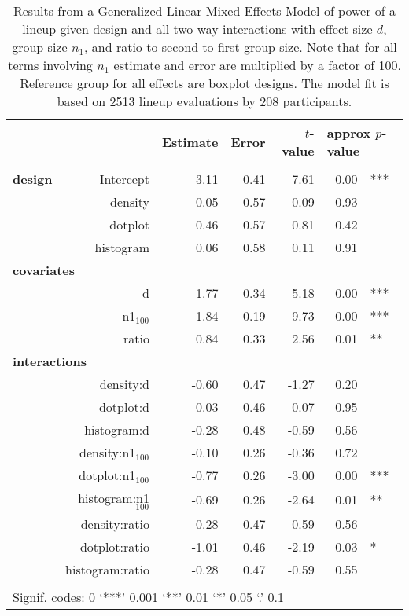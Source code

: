 \begin{table}[ht]
\begin{center}
\resizebox{\linewidth}{!} {
\begin{tabular}{lrrrrrl}
  \hline
& & Estimate & Error & $t$-value & \multicolumn{2}{l}{approx $p$-value} \\   \hline
\\[-8pt]
\bf design& Intercept & -3.11 & 0.41 & -7.61 & 0.00 & ***\\ 
&  density & 0.05 & 0.57 & 0.09 & 0.93 \\ 
&  dotplot & 0.46 & 0.57 & 0.81 & 0.42\\ 
&  histogram & 0.06 & 0.58 & 0.11 & 0.91 \\ [2pt]
\multicolumn{2}{l}{\bf covariates}\\
&  d & 1.77 & 0.34 & 5.18 & 0.00 & ***\\ 
&  n1$_{100}$ & 1.84 & 0.19 & 9.73 & 0.00 & ***\\ 
&  ratio & 0.84 & 0.33 & 2.56 & 0.01 & **\\ 
\multicolumn{2}{l}{\bf interactions}\\
&  density:d & -0.60 & 0.47 & -1.27 & 0.20 \\ 
&  dotplot:d & 0.03 & 0.46 & 0.07 & 0.95  \\ 
&  histogram:d & -0.28 & 0.48 & -0.59 & 0.56 \\ [1pt]
&  density:n1$_{100}$ & -0.10 & 0.26 & -0.36 & 0.72\\ 
&  dotplot:n1$_{100}$ & -0.77 & 0.26 & -3.00 & 0.00 & ***\\ 
&  histogram:n1$_{100}$ & -0.69 & 0.26 & -2.64 & 0.01 & ** \\ [1pt]
&  density:ratio & -0.28 & 0.47 & -0.59 & 0.56 \\ 
&  dotplot:ratio & -1.01 & 0.46 & -2.19 & 0.03 & * \\ 
&  histogram:ratio & -0.28 & 0.47 & -0.59 & 0.55 \\ 
   \hline
\\[-5pt]
   \multicolumn{5}{l}{Signif. codes:  0 `***' 0.001 `**' 0.01 `*' 0.05 `.' 0.1}
\end{tabular}}
\end{center}
\caption{\label{tbl:power2}Results from a Generalized Linear Mixed Effects Model of power of a  lineup given design and all two-way interactions with effect size $d$, group size $n_1$, and ratio to second to first group size. 
Note that for all terms involving $n_1$ estimate and error are multiplied by a factor of 100. 
Reference group for all effects are boxplot designs. The model fit is based on 2513 lineup evaluations by 208 participants. }
\end{table}

